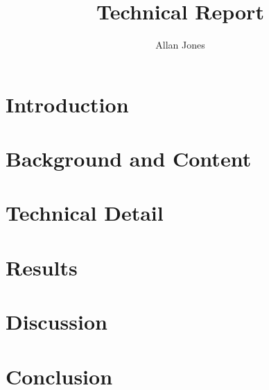 \documentclass{article}
\title{Technical Report}
\author{Allan Jones}
\begin{document}
	\maketitle

\section{Introduction} %
\label{sec:introduction}


\section{Background and Content} %
\label{sec:background_and_content}


\section{Technical Detail} %
\label{sec:technical_detail}


\section{Results} %
\label{sec:results}


\section{Discussion} %
\label{sec:discussion}


\section{Conclusion} %
\label{sec:conclusion}

\end{document}
